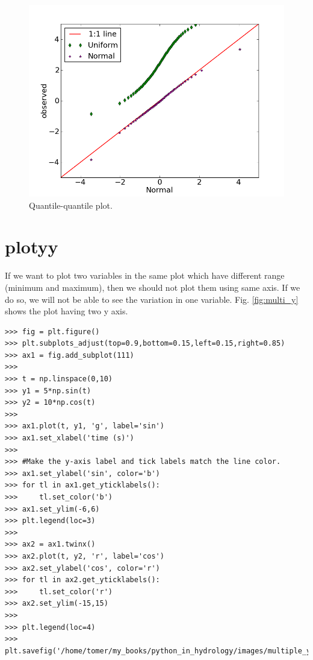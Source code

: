 \documentclass[10pt]{book}
\begin{document}
\beforefig
\begin{figure}[h!]
  \centering
    \includegraphics[scale=0.5]{images/q_q.png}
  \caption{Quantile-quantile plot.}
   \label{fig:q_q}
\end{figure}
\afterfig

\section{plotyy}
If we want to plot two variables in the same plot which have different range (minimum and maximum), then we should not plot them using same axis. If we do so, we will not be able to see the variation in one variable. Fig. \ref{fig:multi_y} shows the plot having two y axis. 
\beforeverb
\begin{verbatim}
>>> fig = plt.figure()
>>> plt.subplots_adjust(top=0.9,bottom=0.15,left=0.15,right=0.85)
>>> ax1 = fig.add_subplot(111)
>>> 
>>> t = np.linspace(0,10)
>>> y1 = 5*np.sin(t)
>>> y2 = 10*np.cos(t)
>>> 
>>> ax1.plot(t, y1, 'g', label='sin')
>>> ax1.set_xlabel('time (s)')
>>> 
>>> #Make the y-axis label and tick labels match the line color.
>>> ax1.set_ylabel('sin', color='b')
>>> for tl in ax1.get_yticklabels():
>>>     tl.set_color('b')
>>> ax1.set_ylim(-6,6)
>>> plt.legend(loc=3)
>>> 
>>> ax2 = ax1.twinx()
>>> ax2.plot(t, y2, 'r', label='cos')
>>> ax2.set_ylabel('cos', color='r')
>>> for tl in ax2.get_yticklabels():
>>>     tl.set_color('r')
>>> ax2.set_ylim(-15,15)    
>>> 
>>> plt.legend(loc=4)
>>> plt.savefig('/home/tomer/my_books/python_in_hydrology/images/multiple_y.png')
\end{verbatim}
\afterverb
\end{document}
